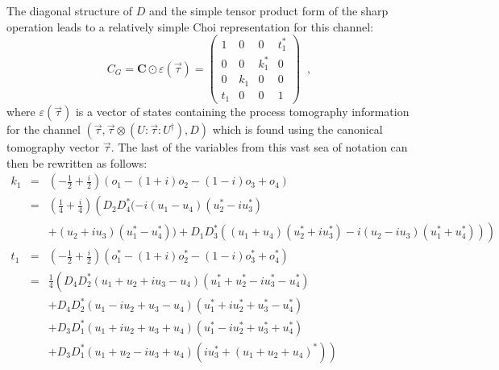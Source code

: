 The diagonal structure of $D$ and the simple tensor product form of the sharp operation leads to a relatively simple Choi representation for this channel:
$$
C_G = \mathbf{C}\odot\varepsilon(\vec{\tau}) = \begin{pmatrix}
1&0&0&t_1^*\\
0&0&k_1^*&0\\
0&k_1&0&0\\
t_1&0&0&1
\end{pmatrix}\;\;,
$$
where $\varepsilon(\vec{\tau})$ is a vector of states containing the process tomography information for the channel $(\vec{\tau},\vec{\tau}\otimes \left(U:\vec{\tau}:U^\dagger\right),D)$ which is found using the canonical tomography vector $\vec{\tau}$.  The last of the variables from this vast sea of notation can then be rewritten as follows:
\begin{eqnarray*}
k_1 &=& \left(-\frac{1}{2}+\frac{i}{2}\right) (o_1-(1+i) o_2-(1-i) o_3+o_4)\\
&=& \left(\frac{1}{4} + \frac{i}{4}\right) \left(D_2 D_4^* (-i (u_1 - u_4) (u_2^* - i u_3^*) \right.\\
& & \left. + (u_2 + i u_3) (u_1^* - u_4^*)) + D_1 D_3^* ((u_1 + u_4) (u_2^* + i u_3^*) - i (u_2 - i u_3) (u_1^* + u_4^*))\right)\\
t_1 &=& \left(-\frac{1}{2}+\frac{i}{2}\right) (o_1^*-(1+i) o_2^*-(1-i) o_3^*+o_4^*)\\
&=& \frac{1}{4} \left(D_4 D_2^*(u_1 + u_2 + i u_3 - u_4) (u_1^* + u_2^* - i u_3^* - u_4^*)\right.\\
& & + D_4 D_2^* (u_1 - i u_2 + u_3 - u_4) (u_1^* + i u_2^* + u_3^* -u_4^*) \\
& &+ D_3 D_1^*(u_1 + i u_2 + u_3 + u_4)(u_1^* - i u_2^* + u_3^* + u_4^*)\\
& &\left. + D_3 D_1^* (u_1 + u_2 - i u_3 + u_4) (i u_3^* + (u_1 + u_2 + u_4)^*)\right)
\end{eqnarray*}

